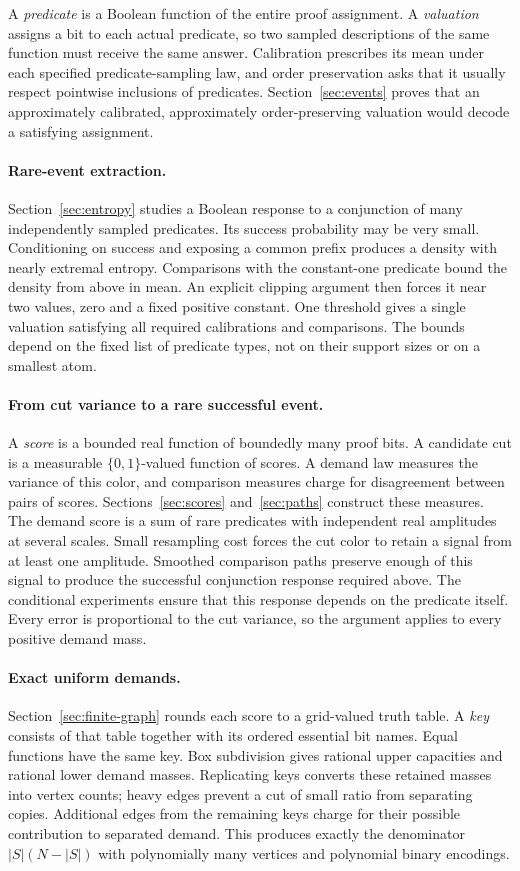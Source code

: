 A \emph{predicate} is a Boolean function of the entire proof assignment.
A \emph{valuation} assigns a bit to each actual predicate, so two sampled
descriptions of the same function must receive the same answer.
Calibration prescribes its mean under each specified predicate-sampling
law, and order preservation
asks that it usually respect pointwise inclusions of predicates.
Section~\ref{sec:events} proves that an approximately calibrated,
approximately order-preserving valuation would decode a satisfying
assignment.

\paragraph{Rare-event extraction.}
Section~\ref{sec:entropy} studies a Boolean response to a conjunction of
many independently sampled predicates. Its success probability may be
very small. Conditioning on success and exposing a common prefix
produces a density with nearly extremal entropy. Comparisons with the
constant-one predicate bound the density from above in mean. An explicit
clipping argument then forces it near two values, zero and a fixed
positive constant. One threshold gives a single valuation satisfying all
required calibrations and comparisons. The bounds depend on the fixed
list of predicate types, not on their support sizes or on a smallest atom.

\paragraph{From cut variance to a rare successful event.}
A \emph{score} is a bounded real function of boundedly many proof bits.
A candidate cut is a measurable $\{0,1\}$-valued function of scores.
A demand law
measures the variance of this color, and comparison measures charge for
disagreement between pairs of scores. Sections~\ref{sec:scores}
and~\ref{sec:paths} construct these measures. The demand score is a sum
of rare predicates with independent real amplitudes at several scales.
Small resampling cost forces the cut color to retain a signal from at
least one amplitude. Smoothed comparison paths preserve enough of this
signal to produce the successful conjunction response required above.
The conditional experiments ensure that this response depends on the
predicate itself. Every error is proportional to the cut variance, so
the argument applies to every positive demand mass.

\paragraph{Exact uniform demands.}
Section~\ref{sec:finite-graph} rounds each score to a grid-valued truth table. A \emph{key} consists
of that table together with its ordered essential bit names. Equal
functions have the same key. Box subdivision gives rational upper
capacities and rational lower demand masses. Replicating keys converts
these retained masses into vertex counts; heavy edges prevent a cut of
small ratio from separating copies. Additional edges from the remaining keys charge for their possible
contribution to separated demand. This produces exactly the denominator
$|S|(N-|S|)$ with polynomially many vertices and polynomial binary
encodings.

